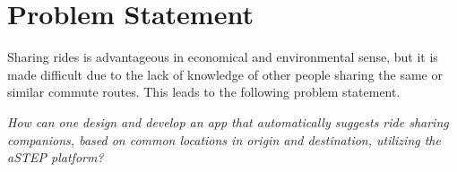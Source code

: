 \section{Problem Statement}
Sharing rides is advantageous in economical and environmental sense, but it is made difficult due to the lack of knowledge of other people sharing the same or similar commute routes.  This leads to the following problem statement.

\textit{How can one design and develop an app that automatically suggests ride sharing companions, based on common locations in origin and destination, utilizing the aSTEP platform?}




